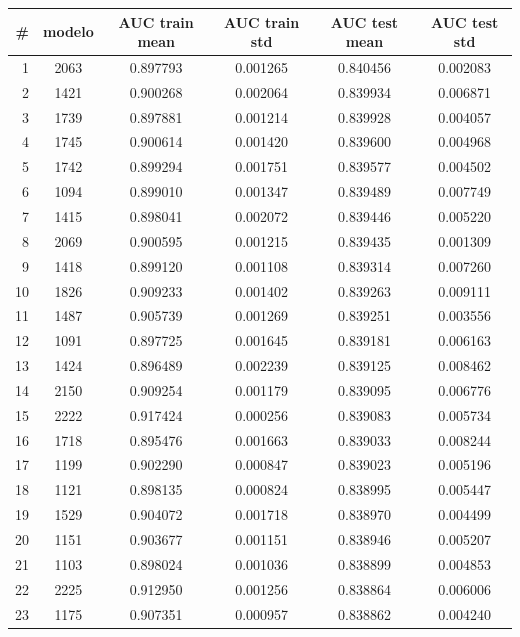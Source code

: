 \documentclass[11pt,a4paper,spanish]{article} %
\begin{document}
\begin{table}[!htbp] 
\begin{center}
\begin{tabular}{rccccc}
  \hline
\# & modelo & AUC train mean & AUC train std & AUC test mean & AUC test std \\ 
  \hline
1 & 2063 & 0.897793 & 0.001265 & 0.840456 & 0.002083 \\ 
  2 & 1421 & 0.900268 & 0.002064 & 0.839934 & 0.006871 \\ 
  3 & 1739 & 0.897881 & 0.001214 & 0.839928 & 0.004057 \\ 
  4 & 1745 & 0.900614 & 0.001420 & 0.839600 & 0.004968 \\ 
  5 & 1742 & 0.899294 & 0.001751 & 0.839577 & 0.004502 \\ 
  6 & 1094 & 0.899010 & 0.001347 & 0.839489 & 0.007749 \\ 
  7 & 1415 & 0.898041 & 0.002072 & 0.839446 & 0.005220 \\ 
  8 & 2069 & 0.900595 & 0.001215 & 0.839435 & 0.001309 \\ 
  9 & 1418 & 0.899120 & 0.001108 & 0.839314 & 0.007260 \\ 
  10 & 1826 & 0.909233 & 0.001402 & 0.839263 & 0.009111 \\ 
  11 & 1487 & 0.905739 & 0.001269 & 0.839251 & 0.003556 \\ 
  12 & 1091 & 0.897725 & 0.001645 & 0.839181 & 0.006163 \\ 
  13 & 1424 & 0.896489 & 0.002239 & 0.839125 & 0.008462 \\ 
  14 & 2150 & 0.909254 & 0.001179 & 0.839095 & 0.006776 \\ 
  15 & 2222 & 0.917424 & 0.000256 & 0.839083 & 0.005734 \\ 
  16 & 1718 & 0.895476 & 0.001663 & 0.839033 & 0.008244 \\ 
  17 & 1199 & 0.902290 & 0.000847 & 0.839023 & 0.005196 \\ 
  18 & 1121 & 0.898135 & 0.000824 & 0.838995 & 0.005447 \\ 
  19 & 1529 & 0.904072 & 0.001718 & 0.838970 & 0.004499 \\ 
  20 & 1151 & 0.903677 & 0.001151 & 0.838946 & 0.005207 \\ 
  21 & 1103 & 0.898024 & 0.001036 & 0.838899 & 0.004853 \\ 
  22 & 2225 & 0.912950 & 0.001256 & 0.838864 & 0.006006 \\ 
  23 & 1175 & 0.907351 & 0.000957 & 0.838862 & 0.004240 \\ 

\end{tabular}
\end{center}
\end{table}
\end{document}
